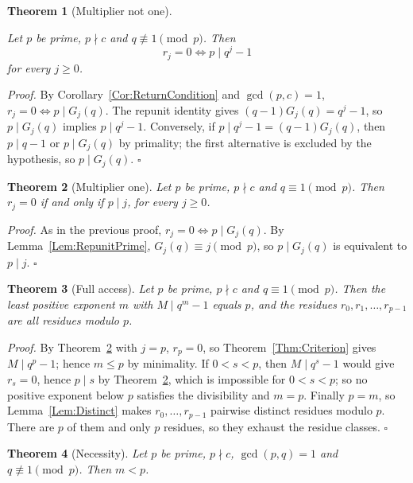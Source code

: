\documentclass[11pt,letterpaper]{article}
\newtheorem{theorem}{Theorem}
\newenvironment{proof}{\noindent\textit{Proof.}}{\hfill\(\square\)}
\begin{document}
\begin{theorem}[Multiplier not one]\label{Thm:PrimeNotOne}
\leavevmode\par
Let \(p\) be prime, \(p\nmid c\) and \(q\not\equiv1\pmod p\). Then
\[
r_j=0\iff p\mid q^{j}-1
\]
for every \(j\ge0\).
\end{theorem}

\begin{proof}
By Corollary~\ref{Cor:ReturnCondition} and \(\gcd(p,c)=1\),
\(r_j=0\iff p\mid G_j(q)\). The repunit identity gives
\((q-1)G_j(q)=q^{j}-1\), so \(p\mid G_j(q)\) implies \(p\mid q^{j}-1\).
Conversely, if \(p\mid q^{j}-1=(q-1)G_j(q)\), then \(p\mid q-1\) or
\(p\mid G_j(q)\) by primality; the first alternative is excluded by the
hypothesis, so \(p\mid G_j(q)\).
\end{proof}

\begin{theorem}[Multiplier one]\label{Thm:PrimeOne}
Let \(p\) be prime, \(p\nmid c\) and \(q\equiv1\pmod p\). Then
\(r_j=0\) if and only if \(p\mid j\), for every \(j\ge0\).
\end{theorem}

\begin{proof}
As in the previous proof, \(r_j=0\iff p\mid G_j(q)\). By
Lemma~\ref{Lem:RepunitPrime}, \(G_j(q)\equiv j\pmod p\), so \(p\mid G_j(q)\)
is equivalent to \(p\mid j\).
\end{proof}

\begin{theorem}[Full access]\label{Thm:FullAccess}
Let \(p\) be prime, \(p\nmid c\) and \(q\equiv1\pmod p\). Then the least
positive exponent \(m\) with \(M\mid q^{m}-1\) equals \(p\), and the residues
\(r_0,r_1,\dots,r_{p-1}\) are all residues modulo \(p\).
\end{theorem}

\begin{proof}
By Theorem~\ref{Thm:PrimeOne} with \(j=p\), \(r_p=0\), so
Theorem~\ref{Thm:Criterion} gives \(M\mid q^{p}-1\); hence \(m\le p\) by
minimality. If \(0<s<p\), then \(M\mid q^{s}-1\) would give \(r_s=0\),
hence \(p\mid s\) by Theorem~\ref{Thm:PrimeOne}, which is impossible for
\(0<s<p\); so no positive exponent below \(p\) satisfies the divisibility
and \(m=p\). Finally \(p=m\), so Lemma~\ref{Lem:Distinct} makes
\(r_0,\dots,r_{p-1}\) pairwise distinct residues modulo \(p\). There are
\(p\) of them and only \(p\) residues, so they exhaust the residue classes.
\end{proof}

\begin{theorem}[Necessity]\label{Thm:PrimeNecessity}
Let \(p\) be prime, \(p\nmid c\), \(\gcd(p,q)=1\) and
\(q\not\equiv1\pmod p\). Then \(m<p\).
\end{theorem}
\end{document}
